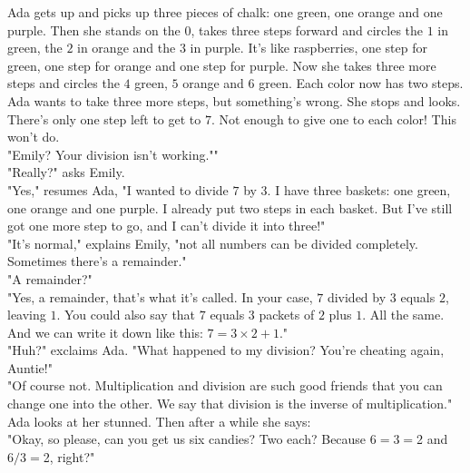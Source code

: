 Ada gets up and picks up three pieces of chalk: one green, one orange and one purple. Then she stands on the $0$, takes three steps forward and circles the $1$ in green, the $2$ in orange and the $3$ in purple. It's like raspberries, one step for green, one step for orange and one step for purple.
Now she takes three more steps and circles the $4$ green, $5$ orange and $6$ green. Each color now has two steps.
Ada wants to take three more steps, but something's wrong. She stops and looks. There's only one step left to get to $7$. Not enough to give one to each color! This won't do.\\
"Emily? Your division isn't working.""\\
"Really?" asks Emily. \\
"Yes," resumes Ada, "I wanted to divide $7$ by $3$. I have three baskets: one green, one orange and one purple. I already put two steps in each basket. But I've still got one more step to go, and I can't divide it into three!"\\
"It's normal," explains Emily, "not all numbers can be divided completely. Sometimes there's a remainder." \\
"A remainder?" \\
"Yes, a remainder, that's what it's called. In your case, $7$ divided by $3$ equals $2$, leaving $1$. You could also say that $7$ equals $3$ packets of $2$ plus $1$. All the same. And we can write it down like this: $7=3\times2+1$." \\
"Huh?" exclaims Ada. "What happened to my division? You're cheating again, Auntie!" \\
"Of course not. Multiplication and division are such good friends that you can change one into the other. We say that division is the inverse of multiplication."\\
Ada looks at her stunned. Then after a while she says: \\
"Okay, so please, can you get us six candies? Two each? Because $6 = 3 = $2 and $6 / 3 = $2, right?" 

